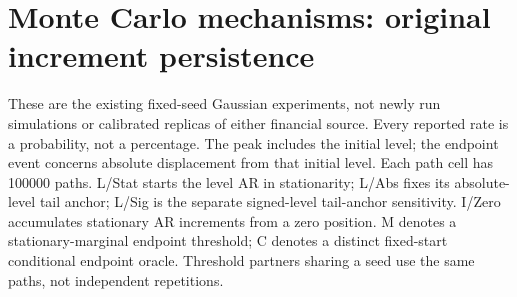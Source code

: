 \section{Monte Carlo mechanisms: original increment persistence}\label{sup:simulation-original}

These are the existing fixed-seed Gaussian experiments, not newly run
simulations or calibrated replicas of either financial source. Every reported
rate is a probability, not a percentage. The peak includes the initial level;
the endpoint event concerns absolute displacement from that initial level.
Each path cell has 100000 paths.
L/Stat starts the level AR in stationarity; L/Abs fixes its absolute-level
tail anchor; L/Sig is the separate signed-level tail-anchor sensitivity.
I/Zero accumulates stationary AR increments from a zero position.
M denotes a stationary-marginal endpoint threshold; C denotes a distinct
fixed-start conditional endpoint oracle. Threshold partners sharing a seed use
the same paths, not independent repetitions.
\begingroup
\footnotesize
\setlength{\tabcolsep}{3pt}
\renewcommand{\arraystretch}{1.12}
